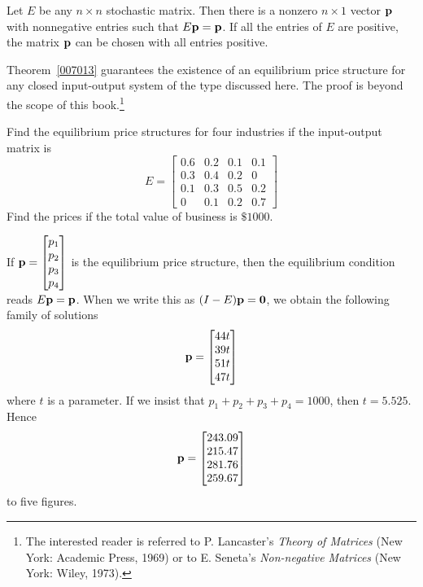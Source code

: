 \documentclass{ximera}
\begin{document}
\begin{theorem}\label{007013}
Let $E$ be any $n \times n$ stochastic matrix. Then there is a nonzero $n \times 1$ vector ${\bf p}$ with nonnegative entries such that $E{\bf p} = {\bf p}$. If all the entries of $E$ are positive, the matrix ${\bf p}$ can be chosen with all entries positive.
\end{theorem}

Theorem~\ref{007013} guarantees the existence of an equilibrium price structure for any closed input-output system of the type discussed here. The proof is beyond the scope of this book.\footnote{The interested reader is referred to P. Lancaster's \textit{Theory of Matrices} (New York: Academic Press, 1969) or to E. Seneta's \textit{Non-negative Matrices} (New York: Wiley, 1973).}

\begin{example}\label{007017}
Find the equilibrium price structures for four industries if the input-output matrix is
\begin{equation*}
E = \begin{bmatrix}
0.6 & 0.2 & 0.1 & 0.1 \\
0.3 & 0.4 & 0.2 & 0 \\
0.1 & 0.3 & 0.5 & 0.2 \\
0 & 0.1 & 0.2 & 0.7
\end{bmatrix} 
\end{equation*}
Find the prices if the total value of business is $\$1000$.

\begin{explanation}
  If ${\bf p} = \begin{bmatrix}
  p_{1} \\
  p_{2} \\
  p_{3} \\
  p_{4}
  \end{bmatrix}$
 is the equilibrium price structure, then the equilibrium condition reads $E{\bf p} = {\bf p}$. When we write this as $(I - E){\bf p} = {\bf 0}$, we obtain the following family of solutions
\begin{equation*}
{\bf p} = \begin{bmatrix}
44t \\
39t \\
51t \\
47t
\end{bmatrix}
\end{equation*}
where $t$ is a parameter. If we insist that $p_{1} + p_{2} + p_{3} + p_{4} = 1000$, then $t = 5.525$. Hence
\begin{equation*}
{\bf p} = \begin{bmatrix}
243.09 \\
215.47 \\
281.76 \\
259.67
\end{bmatrix} 
\end{equation*}
to five figures.
\end{explanation}
\end{example}
\end{document}

